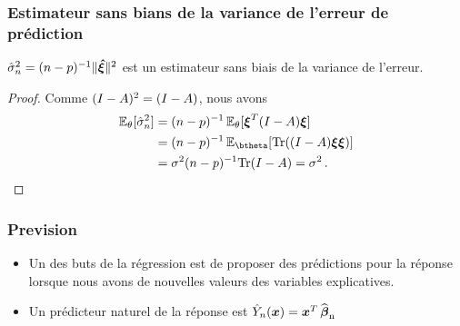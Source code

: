 \begin{frame}
\frametitle{Estimateur sans bians de la variance de l'erreur de prédiction}
\begin{theo}
$\hat{\sigma}_n^2= (n-p)^{-1} \| \boldsymbol{\hat{\xi}} \|^2$ est un estimateur sans biais de la variance de l'erreur.
\end{theo}
\begin{proof}
Comme $(I-A)^2= (I-A)$, nous avons
\begin{align*}
\PE_\theta[\hat{\sigma}_n^2] &= (n-p)^{-1} \PE_{\theta}[ \bnoise^T (I-\projX) \bnoise] \\
                             &= (n-p)^{-1} \PE_{\btheta}[ \mathrm{Tr}( (I-\projX) \bnoise \bnoise) ] \\
                             &= \sigma^2 (n-p)^{-1} \mathrm{Tr}(I-\projX)= \sigma^2 \eqsp.
\end{align*}
\end{proof}
\end{frame}

\begin{frame}
\frametitle{Prevision}
\begin{itemize}
\item Un des buts de la régression est de proposer des prédictions pour la réponse lorsque nous avons de 
nouvelles valeurs des variables explicatives.
\item Un prédicteur naturel de la réponse est \alert{$\hat{Y}_n(\operatorname{\boldsymbol{x}})= \operatorname{\boldsymbol{x}}^T \operatorname{\widehat{\boldsymbol{\beta}}_n}$} 
\end{itemize}
\end{frame}

